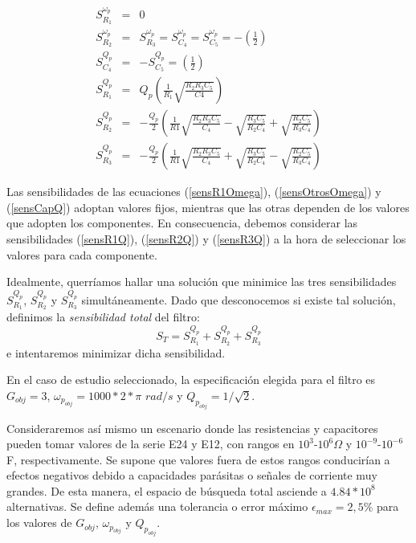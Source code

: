 \documentclass{llncs}
\begin{document}
	\begin{eqnarray}
		S_{R_1}^{\omega_p} &=& 0 \label{sensR1Omega}\\
		S_{R_2}^{\omega_p} &=& S_{R_3}^{\omega_p} = S_{C_4}^{\omega_p} = S_{C_5}^{\omega_p} = -\left(\frac{1}{2}\right) \label{sensOtrosOmega}\\
		S_{C_4}^{Q_p} &=& - S_{C_5}^{Q_p} = \left(\frac{1}{2}\right) \label{sensCapQ}\\
		S_{R_1}^{Q_p} &=& Q_p \left(\frac{1}{R_1} \sqrt{\frac{R_2 R_3 C_5}{C4}}\right) \label{sensR1Q}\\
		S_{R_2}^{Q_p} &=& - \frac{Q_p}{2} \left(\frac{1}{R1} \sqrt{\frac{R_2 R_3 C_5}{C_4}} - \sqrt{\frac{R_3 C_5}{R_2 C_4}} + \sqrt{\frac{R_2 C_5}{R_3 C_4}}\right) \label{sensR2Q}\\
		S_{R_3}^{Q_p} &=& - \frac{Q_p}{2} \left(\frac{1}{R1} \sqrt{\frac{R_2 R_3 C_5}{C_4}} + \sqrt{\frac{R_3 C_5}{R_2 C_4}} - \sqrt{\frac{R_2 C_5}{R_3 C_4}}\right) \label{sensR3Q}
	\end{eqnarray}
	
	Las sensibilidades de las ecuaciones (\ref{sensR1Omega}), (\ref{sensOtrosOmega}) y (\ref{sensCapQ}) adoptan 
	valores fijos, mientras que las otras dependen de los valores que adopten los componentes. 
	En consecuencia, debemos considerar las sensibilidades (\ref{sensR1Q}), (\ref{sensR2Q}) y (\ref{sensR3Q}) 
	a la hora de seleccionar los valores para cada componente. 
	
	Idealmente, querríamos hallar una solución que minimice las tres sensibilidades $S_{R_1}^{Q_p}$, $S_{R_2}^{Q_p}$ y
	$S_{R_3}^{Q_p}$ simultáneamente. Dado que desconocemos si existe tal solución, definimos la \textit{sensibilidad total} del filtro:
	\begin{equation}
		S_T = S_{R_1}^{Q_p}  + S_{R_2}^{Q_p} + S_{R_3}^{Q_p}
	\end{equation} 
	e intentaremos minimizar dicha sensibilidad.
	
	En el caso de estudio seleccionado, la especificación elegida para el filtro es $G_{obj} = 3$,
	$\omega_{p_{obj}}=1000*2*\pi$ $rad/s$ y $Q_{p_{obj}} = 1 / \sqrt{2}$. 
	
	Consideraremos así mismo un escenario donde las resistencias y capacitores pueden tomar valores de la serie E24 y E12, con rangos en $10^3$-$10^6$$\Omega$ y $10^{-9}$-$10^{-6}$F, respectivamente. Se supone que valores fuera de estos rangos conducirían a efectos negativos debido a capacidades parásitas o señales de corriente muy grandes. De esta manera, el espacio de búsqueda total asciende a 
	$4.84*10^8$ alternativas. Se define además una tolerancia o error máximo $\epsilon_{max} = 2,5\%$ para los valores de $G_{obj}$,
	$\omega_{p_{obj}}$ y $Q_{p_{obj}}$.	
    
\end{document}
